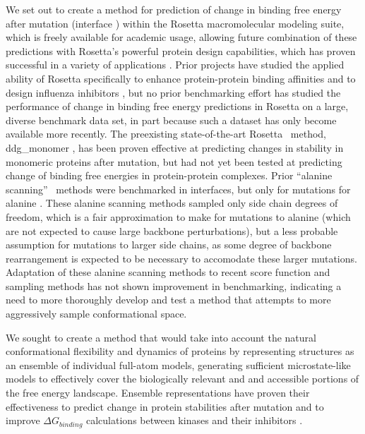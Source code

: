 We set out to create a method for prediction of change in binding free energy after mutation (interface \ddg) within the Rosetta macromolecular modeling suite, which is freely available for academic usage, allowing future combination of these predictions with Rosetta's powerful protein design capabilities, which has proven successful in a variety of applications \cite{tinberg_computational_2013,kaufmann_practically_2010}.
Prior projects have studied the applied ability of Rosetta specifically to enhance protein-protein binding affinities \cite{sammond_structure-based_2007} and to design influenza inhibitors \cite{whitehead_optimization_2012}, but no prior benchmarking effort has studied the performance of change in binding free energy predictions in Rosetta on a large, diverse benchmark data set, in part because such a dataset has only become available more recently.
The preexisting state-of-the-art Rosetta \ddg\ method,  ddg\_monomer \cite{kellogg_role_2011}, has been proven effective at predicting changes in stability in monomeric proteins after mutation, but had not yet been tested at predicting change of binding free energies in protein-protein complexes.
Prior ``alanine scanning'' \ddg\ methods were benchmarked in interfaces, but only for mutations for alanine \cite{kortemme_simple_2002,kortemme_computational_2004,conchuir_web_2015}.
These alanine scanning methods sampled only side chain degrees of freedom, which is a fair approximation to make for mutations to alanine (which are not expected to cause large backbone perturbations\cite{cunningham_high-resolution_1989}), but a less probable assumption for mutations to larger side chains, as some degree of backbone rearrangement is expected to be necessary to accomodate these larger mutations.
Adaptation of these alanine scanning methods to recent score function and sampling methods has not shown improvement in benchmarking\cite{conchuir_web_2015}, indicating a need to more thoroughly develop and test a method that attempts to more aggressively sample conformational space.

We sought to create a method that would take into account the natural conformational flexibility and dynamics of proteins by representing structures as an ensemble of individual full-atom models, generating sufficient microstate-like models to effectively cover the biologically relevant and and accessible portions of the free energy landscape.
Ensemble representations have proven their effectiveness to predict change in protein stabilities after mutation\cite{benedix_predicting_2009} and to improve $\Delta G_{binding}$ calculations between kinases and their inhibitors \cite{araki_effect_2016}.

